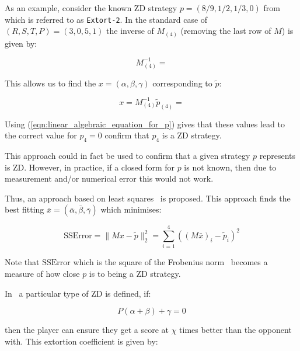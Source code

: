 \documentclass[a4paper]{article}
\begin{document}
As an example, consider the known ZD strategy \(p=(8 / 9, 1 / 2, 1 / 3, 0)\)
from~\cite{Stewart2012} which is referred to as \texttt{Extort-2}. In the
standard case of \((R, S, T, P)=(3, 0, 5, 1)\) the inverse
of \(M_{(4)}\) (removing the last row of \(M\)) is given by:

\begin{equation}\label{eqn:inverse_of_M4}
    M_{(4)}^{-1} =
    
\end{equation}

This allows us to find the \(x=(\alpha, \beta, \gamma)\) corresponding to
\(\tilde p\):

\begin{equation}\label{eqn:alpha_beta_gamma_for_extort_2}
    x = M_{(4)}^{-1}\tilde p_{(4)} =
    
\end{equation}

Using (\ref{eqn:linear_algebraic_equation_for_p}) gives that these values lead
to the correct value for \(p_4=0\) confirm that \(p_4\) is a ZD strategy.

This approach could in fact be used to confirm that a given strategy \(p\)
represents is ZD. However, in practice, if a closed form for \(p\) is not
known, then due to measurement and/or numerical error this would not work.

Thus, an approach based on least squares~\cite{Golub2013} is proposed. This
approach finds the best fitting \(\bar x=(\bar\alpha, \bar\beta,
\bar\gamma)\) which minimises:

\begin{equation}\label{eqn:r_squared}
    \text{SSError} = \|M x-\tilde p\|_2^2 = \sum_{i=1}^{4}\left((M\bar x)_i-\tilde p_i\right)^2
\end{equation}

Note that \(\text{SSError}\) which is the square of the Frobenius
norm~\cite{Golub2013} becomes a measure of how close \(p\) is to being a ZD
strategy.

In~\cite{Press2012} a particular type of ZD is defined, if:

\begin{equation}\label{eqn:constraint_for_extortion}
    P(\alpha + \beta)+\gamma=0
\end{equation}

then the player can ensure they get a score at \(\chi\) times
better than the opponent with. This extortion coefficient is given by:
\end{document}
